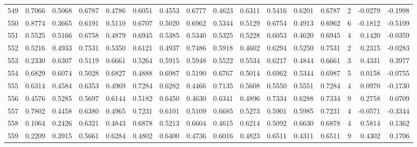 \begin{tabular}{lrrrrrrrrrrrrrrr}
549 &      0.7066 &  0.5068 &  0.6787 &  0.4786 &  0.6051 &  0.4553 &  0.6777 &  0.4623 &  0.6311 &  0.5416 &   0.6201 &     0.6787 &      2 &                   -0.0279 &                    -0.1998 \\
550 &      0.8774 &  0.3665 &  0.6191 &  0.5110 &  0.6707 &  0.5020 &  0.6962 &  0.5344 &  0.5129 &  0.6754 &   0.4913 &     0.6962 &      6 &                   -0.1812 &                    -0.5109 \\
551 &      0.5525 &  0.5166 &  0.6758 &  0.4879 &  0.6945 &  0.5385 &  0.5340 &  0.5325 &  0.5228 &  0.6053 &   0.4620 &     0.6945 &      4 &                    0.1420 &                    -0.0359 \\
552 &      0.5216 &  0.4933 &  0.7531 &  0.5350 &  0.6121 &  0.4937 &  0.7486 &  0.5918 &  0.4602 &  0.6294 &   0.5250 &     0.7531 &      2 &                    0.2315 &                    -0.0283 \\
553 &      0.2330 &  0.6307 &  0.5119 &  0.6661 &  0.5264 &  0.5915 &  0.5948 &  0.5522 &  0.5534 &  0.6217 &   0.4844 &     0.6661 &      3 &                    0.4331 &                     0.3977 \\
554 &      0.6829 &  0.6074 &  0.5028 &  0.6827 &  0.4888 &  0.6987 &  0.5190 &  0.6767 &  0.5014 &  0.6962 &   0.5344 &     0.6987 &      5 &                    0.0158 &                    -0.0755 \\
555 &      0.6314 &  0.4584 &  0.6353 &  0.4969 &  0.7284 &  0.6282 &  0.4466 &  0.7135 &  0.5608 &  0.5550 &   0.5551 &     0.7284 &      4 &                    0.0970 &                    -0.1730 \\
556 &      0.4576 &  0.5285 &  0.5697 &  0.6144 &  0.5182 &  0.6450 &  0.4630 &  0.6341 &  0.4896 &  0.7334 &   0.6288 &     0.7334 &      9 &                    0.2758 &                     0.0709 \\
557 &      0.7802 &  0.4458 &  0.6380 &  0.4965 &  0.7231 &  0.6101 &  0.5109 &  0.6685 &  0.5273 &  0.5901 &   0.5985 &     0.7231 &      4 &                   -0.0571 &                    -0.3344 \\
558 &      0.1064 &  0.2426 &  0.6321 &  0.4843 &  0.6878 &  0.5213 &  0.6604 &  0.4615 &  0.6214 &  0.5092 &   0.6630 &     0.6878 &      4 &                    0.5814 &                     0.1362 \\
559 &      0.2209 &  0.3915 &  0.5661 &  0.6284 &  0.4802 &  0.6400 &  0.4736 &  0.6016 &  0.4823 &  0.6511 &   0.4311 &     0.6511 &      9 &                    0.4302 &                     0.1706 \\

\end{tabular}
